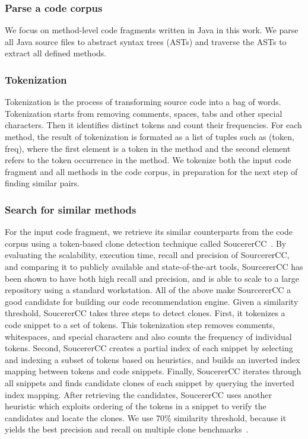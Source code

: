 \subsubsection{Parse a code corpus}
We focus on method-level code fragments written in Java in this work. We parse all Java source files to abstract syntax trees (ASTs) and traverse the ASTs to extract all defined methods.

\subsubsection{Tokenization}
Tokenization is the process of transforming source code into a bag of words. Tokenization starts from removing comments, spaces, tabs and other special characters. Then it identifies distinct tokens and count their frequencies. For each method, the result of tokenization is formated as a list of tuples such as {\ttt (token, freq)}, where the first element is a token in the method and the second element refers to the token occurrence in the method.
We tokenize both the input code fragment and all methods in the code corpus, in preparation for the next step of finding similar pairs.

\subsubsection{Search for similar methods}
For the input code fragment, we retrieve its similar counterparts from the code corpus using a token-based clone detection technique called SoucererCC~\cite{sajnani2016sourcerercc}. By evaluating the scalability, execution time, recall and precision of SourcererCC, and comparing it to publicly available and state-of-the-art tools, SourcererCC has been shown to have both high recall and precision, and is able to scale to a large repository using a standard workstation. All of the above make SourcererCC a good candidate for building our code recommendation engine. Given a similarity threshold, SoucererCC takes three steps to detect clones. First, it tokenizes a code snippet to a set of tokens. This tokenization step removes comments, whitespaces, and special characters and also counts the frequency of individual tokens. Second, SoucererCC creates a partial index of each snippet by selecting and indexing a subset of tokens based on heuristics, and builds an inverted index mapping between tokens and code snippets. Finally, SoucererCC iterates through all snippets and finds candidate clones of each snippet by querying the inverted index mapping. After retrieving the candidates, SoucererCC uses another heuristic which exploits ordering of the tokens in a snippet to verify the candidates and locate the clones. We use 70\% similarity threshold, because it yields the best precision and recall on multiple clone benchmarks~\cite{sajnani2016sourcerercc}. 

